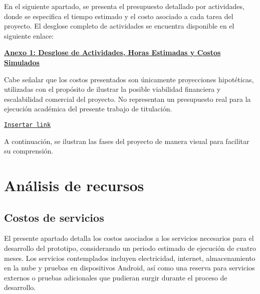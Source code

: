 En el siguiente apartado, se presenta el presupuesto detallado por actividades, donde se especifica el tiempo estimado y el costo asociado a cada tarea del proyecto.
El desglose completo de actividades se encuentra disponible en el siguiente enlace:

\begin{flushleft} \href{ruta_del_anexo_o_enlace}{\textbf{Anexo 1: Desglose de Actividades, Horas Estimadas y Costos Simulados}} \end{flushleft}

Cabe señalar que los costos presentados son únicamente proyecciones hipotéticas, utilizadas con el propósito de ilustrar la posible viabilidad financiera y escalabilidad comercial del proyecto. No representan un presupuesto real para la ejecución académica del presente trabajo de titulación.

\texttt{\url{Insertar link}}

A continuación, se ilustran las fases del proyecto de manera visual para facilitar su comprensión.


\section{Análisis de recursos}

\subsection{Costos de servicios}

El presente apartado detalla los costos asociados a los servicios necesarios para el desarrollo del prototipo, considerando un periodo estimado de ejecución de cuatro meses. Los servicios contemplados incluyen electricidad, internet, almacenamiento en la nube y pruebas en dispositivos Android, así como una reserva para servicios externos o pruebas adicionales que pudieran surgir durante el proceso de desarrollo.

